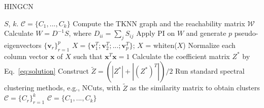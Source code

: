 \begin{algorithm}
\begin{small}
\caption{HINGCN}
\label{alg}
\begin{algorithmic}[1]
\Require $S$, $k$.
\Ensure $\mathcal{C} = \{C_1, ..., C_k\}$
\State Compute the TKNN graph and the reachability matrix $\mathcal{W}$
\State Calculate $W = D^{-1}S$, where $D_{ii} = \sum_jS_{ij}$
\State Apply PI on $W$ and generate $p$ pseudo-eigenvectors $\{\bm{v}_r\}_{r=1}^p$
\State $X = \{\bm{v}_1^T; \bm{v}_2^T; ...; \bm{v}_p^T\}$; $X$ = whiten($X$)
\State Normalize each column vector $\bm{x}$ of $X$ such that $\bm{x}^T\bm{x} = 1$
\State Calculate the coefficient matrix $Z^*$ by Eq.~\ref{eq:solution}
\State Construct $\tilde{Z} = (|Z^*| + |(Z^*)^T|)/2$
\State Run standard spectral clustering methods, e.g., NCuts, with $\tilde{Z}$ as the
similarity matrix to obtain clusters $\mathcal{C} = \{C_r\}_{r=1}^k$
\State \Return $\mathcal{C} = \{C_1, ..., C_k\}$
\end{algorithmic}
\end{small}
\end{algorithm}









